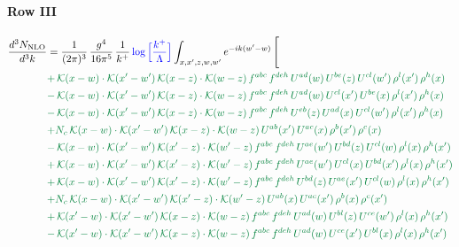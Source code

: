 \documentclass[10pt]{article}
\numberwithin{equation}{section}
\newcommand{\new}[1]{{\color{blue}#1}}
\begin{document}
 \paragraph{Row III}
 \begin{align}
\frac{d^{3}N_{\mathrm{NLO}}}{d^{3}k} & = \frac{1}{(2\pi)^{3}}\,\frac{g^{4}}{16\pi^{5}}\,\frac{1}{k^{+}}\,\new{\log\Big[\frac{k^{+}}{\Lambda}\Big]}\int_{x,x',z,w,w'}e^{-ik(w'-w)}\,\Bigg[\notag\\ &{\color{JIM}  +\,\mathcal{K}(x-w)\cdot\mathcal{K}(x'-w')\,\mathcal{K}(x-z)\cdot\mathcal{K}(w-z)\,f^{abc}\,f^{deh}\,U^{ad}(w)\,U^{be}(z)\,U^{cl}(w')\,\rho^{l}(x')\,\rho^{h}(x)} \notag\\
&{\color{JIM} -\,\mathcal{K}(x-w)\cdot\mathcal{K}(x'-w')\,\mathcal{K}(x-z)\cdot\mathcal{K}(w-z)\,f^{abc}\,f^{deh}\,U^{ad}(w)\,U^{cl}(x')\,U^{be}(x)\,\rho^{l}(x')\,\rho^{h}(x)} \notag\\
&{\color{JIM} -\,\mathcal{K}(x-w)\cdot\mathcal{K}(x'-w')\,\mathcal{K}(x-z)\cdot\mathcal{K}(w-z)\,f^{abc}\,f^{deh}\,U^{eb}(z)\,U^{ad}(x)\,U^{cl}(w')\,\rho^{l}(x')\,\rho^{h}(x)} \notag\\
&{\color{JIM} +N_{c}\,\mathcal{K}(x-w)\cdot\mathcal{K}(x'-w')\,\mathcal{K}(x-z)\cdot\mathcal{K}(w-z)\,U^{ab}(x')\,U^{ac}(x)\,\rho^{b}(x')\,\rho^{c}(x)} \notag\\
&{\color{JIM} -\,\mathcal{K}(x-w)\cdot\mathcal{K}(x'-w')\,\mathcal{K}(x'-z)\cdot\mathcal{K}(w'-z)\,f^{abc}\,f^{deh}\,U^{ae}(w')\,U^{bd}(z)\,U^{cl}(w)\,\rho^{l}(x)\,\rho^{h}(x')} \notag\\
&{\color{JIM} +\,\mathcal{K}(x-w)\cdot\mathcal{K}(x'-w')\,\mathcal{K}(x'-z)\cdot\mathcal{K}(w'-z)\,f^{abc}\,f^{deh}\,U^{ae}(w')\,U^{cl}(x)\,U^{bd}(x')\,\rho^{l}(x)\,\rho^{h}(x')} \notag\\
&{\color{JIM} +\,\mathcal{K}(x-w)\cdot\mathcal{K}(x'-w')\,\mathcal{K}(x'-z)\cdot\mathcal{K}(w'-z)\,f^{abc}\,f^{deh}\,U^{bd}(z)\,U^{ae}(x')\,U^{cl}(w)\,\rho^{l}(x)\,\rho^{h}(x')} \notag\\
&{\color{JIM} +N_{c}\,\mathcal{K}(x-w)\cdot\mathcal{K}(x'-w')\,\mathcal{K}(x'-z)\cdot\mathcal{K}(w'-z)\,U^{ab}(x)\,U^{ac}(x')\,\rho^{b}(x)\,\rho^{c}(x')} \notag\\
&{\color{JIM} +\,\mathcal{K}(x'-w)\cdot\mathcal{K}(x'-w')\,\mathcal{K}(x-z)\cdot\mathcal{K}(w-z)\,f^{abc}\,f^{deh}\,U^{ad}(w)\,U^{bl}(z)\,U^{ce}(w')\,\rho^{l}(x)\,\rho^{h}(x')} \notag\\
&{\color{JIM} -\,\mathcal{K}(x'-w)\cdot\mathcal{K}(x'-w')\,\mathcal{K}(x-z)\cdot\mathcal{K}(w-z)\,f^{abc}\,f^{deh}\,U^{ad}(w)\,U^{ce}(x')\,U^{bl}(x)\,\rho^{l}(x)\,\rho^{h}(x')} \notag\\

\end{align}
\end{document}
